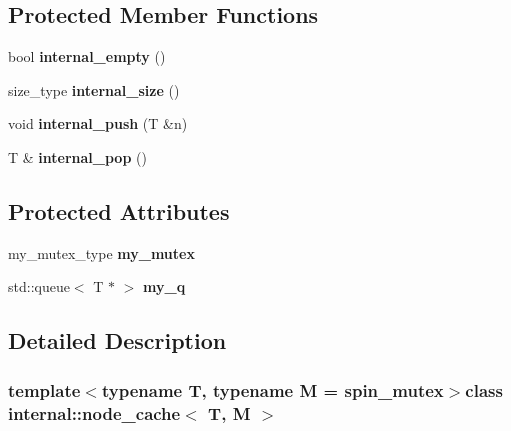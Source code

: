 \subsection*{Protected Member Functions}
\begin{DoxyCompactItemize}
\item 
\hypertarget{classinternal_1_1node__cache_aaeb97ee69e8bc4e26246d2bddf0e1d93}{}bool {\bfseries internal\+\_\+empty} ()\label{classinternal_1_1node__cache_aaeb97ee69e8bc4e26246d2bddf0e1d93}

\item 
\hypertarget{classinternal_1_1node__cache_ad947424ec09375bc57277cd7f721691b}{}size\+\_\+type {\bfseries internal\+\_\+size} ()\label{classinternal_1_1node__cache_ad947424ec09375bc57277cd7f721691b}

\item 
\hypertarget{classinternal_1_1node__cache_a8fd5c5a1c88b70cd41a805279db889c7}{}void {\bfseries internal\+\_\+push} (T \&n)\label{classinternal_1_1node__cache_a8fd5c5a1c88b70cd41a805279db889c7}

\item 
\hypertarget{classinternal_1_1node__cache_a0af53d2a937ec7130299576a9e1cdb81}{}T \& {\bfseries internal\+\_\+pop} ()\label{classinternal_1_1node__cache_a0af53d2a937ec7130299576a9e1cdb81}

\end{DoxyCompactItemize}
\subsection*{Protected Attributes}
\begin{DoxyCompactItemize}
\item 
\hypertarget{classinternal_1_1node__cache_a484a42dc5f3a2cedeb0b5624f2e61eff}{}my\+\_\+mutex\+\_\+type {\bfseries my\+\_\+mutex}\label{classinternal_1_1node__cache_a484a42dc5f3a2cedeb0b5624f2e61eff}

\item 
\hypertarget{classinternal_1_1node__cache_a624b48b6aa7de59af1ad3bc03dd91661}{}std\+::queue$<$ T $\ast$ $>$ {\bfseries my\+\_\+q}\label{classinternal_1_1node__cache_a624b48b6aa7de59af1ad3bc03dd91661}

\end{DoxyCompactItemize}


\subsection{Detailed Description}
\subsubsection*{template$<$typename T, typename M = spin\+\_\+mutex$>$class internal\+::node\+\_\+cache$<$ T, M $>$}

